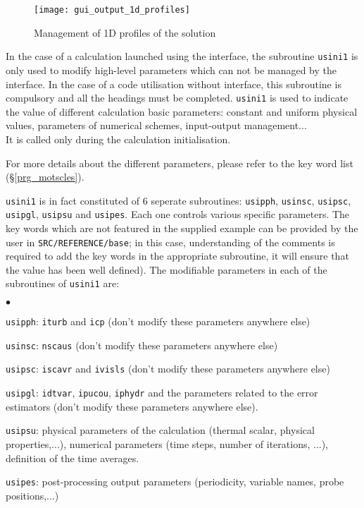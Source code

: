 {{\begin{figure}[!ht]
\begin{center}
\texttt{[image: gui\_output\_1d\_profiles]}
\caption{Management of 1D profiles of the solution}
\label{fig:26_GUI}
\end{center}
\end{figure}

In the case of a calculation launched using the interface, the subroutine \texttt{usini1} is only
used to modify high-level parameters which can not be managed by the
interface. In the case of a code utilisation without interface, this
subroutine is compulsory and all the headings must be completed. \texttt{usini1} is used to indicate the value of different calculation
basic parameters: constant and uniform physical values, parameters of
numerical schemes, input-output management...\\
It is called only during the calculation initialisation.

For more details about the different parameters, please refer to the key
word list (\S\ref{prg_motscles}).

\texttt{usini1} is in fact constituted of 6 seperate subroutines:  \texttt{usipph},
 \texttt{usinsc}, \texttt{usipsc}, \texttt{usipgl},
\texttt{usipsu} and \texttt{usipes}. Each one controls various
 specific parameters. The key words which are not featured in the supplied example
can be provided by the user in \texttt{SRC/REFERENCE/base}; in this case,
understanding of the comments is required to add the key words in the appropriate
subroutine, it will ensure that the value
has been well defined). The modifiable parameters in each of the subroutines of
\texttt{usini1} are:

\begin{list}{$\bullet$}{}
\item \texttt{usipph}: \texttt{iturb} and \texttt{icp} (don't modify these
      parameters anywhere else)
\item \texttt{usinsc}: \texttt{nscaus} (don't modify these parameters anywhere
      else)
\item \texttt{usipsc}: \texttt{iscavr} and \texttt{ivisls} (don't modify these
      parameters anywhere else)
\item \texttt{usipgl}: \texttt{idtvar}, \texttt{ipucou}, \texttt{iphydr} and the
      parameters related to the error estimators (don't modify these parameters
      anywhere else).
\item \texttt{usipsu}: physical parameters of the calculation (thermal scalar, physical
      properties,...), numerical parameters (time steps, number of iterations, ...),
      definition of the time averages.
\item \texttt{usipes}: post-processing output parameters (periodicity, variable names,
      probe positions,...)
\end{list}

}}
